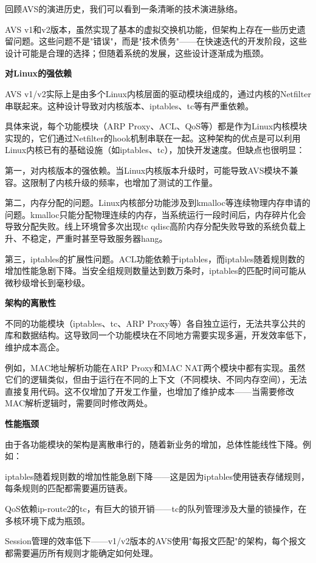 回顾AVS的演进历史，我们可以看到一条清晰的技术演进脉络。

AVS v1和v2版本，虽然实现了基本的虚拟交换机功能，但架构上存在一些历史遗留问题。这些问题不是"错误"，而是"技术债务"——在快速迭代的开发阶段，这些设计可能是合理的选择；但随着系统的发展，这些设计逐渐成为瓶颈。

\textbf{对Linux的强依赖}

AVS v1/v2实际上是由多个Linux内核层面的驱动模块组成的，通过内核的Netfilter串联起来。这种设计导致对内核版本、iptables、tc等有严重依赖。

具体来说，每个功能模块（ARP Proxy、ACL、QoS等）都是作为Linux内核模块实现的，它们通过Netfilter的hook机制串联在一起。这种架构的优点是可以利用Linux内核已有的基础设施（如iptables、tc），加快开发速度。但缺点也很明显：

第一，对内核版本的强依赖。当Linux内核版本升级时，可能导致AVS模块不兼容。这限制了内核升级的频率，也增加了测试的工作量。

第二，内存分配的问题。Linux内核部分功能涉及到kmalloc等连续物理内存申请的问题。kmalloc只能分配物理连续的内存，当系统运行一段时间后，内存碎片化会导致分配失败。线上环境曾多次出现tc qdisc高阶内存分配失败导致的系统负载上升、不稳定，严重时甚至导致服务器hang。

第三，iptables的扩展性问题。ACL功能依赖于iptables，而iptables随着规则数的增加性能急剧下降。当安全组规则数量达到数万条时，iptables的匹配时间可能从微秒级增长到毫秒级。

\textbf{架构的离散性}

不同的功能模块（iptables、tc、ARP Proxy等）各自独立运行，无法共享公共的库和数据结构。这导致同一个功能模块在不同地方需要实现多遍，开发效率低下，维护成本高企。

例如，MAC地址解析功能在ARP Proxy和MAC NAT两个模块中都有实现。虽然它们的逻辑类似，但由于运行在不同的上下文（不同模块、不同内存空间），无法直接复用代码。这不仅增加了开发工作量，也增加了维护成本——当需要修改MAC解析逻辑时，需要同时修改两处。

\textbf{性能瓶颈}

由于各功能模块的架构是离散串行的，随着新业务的增加，总体性能线性下降。例如：

iptables随着规则数的增加性能急剧下降——这是因为iptables使用链表存储规则，每条规则的匹配都需要遍历链表。

QoS依赖ip-route2的tc，有巨大的锁开销——tc的队列管理涉及大量的锁操作，在多核环境下成为瓶颈。

Session管理的效率低下——v1/v2版本的AVS使用"每报文匹配"的架构，每个报文都需要遍历所有规则才能确定如何处理。

